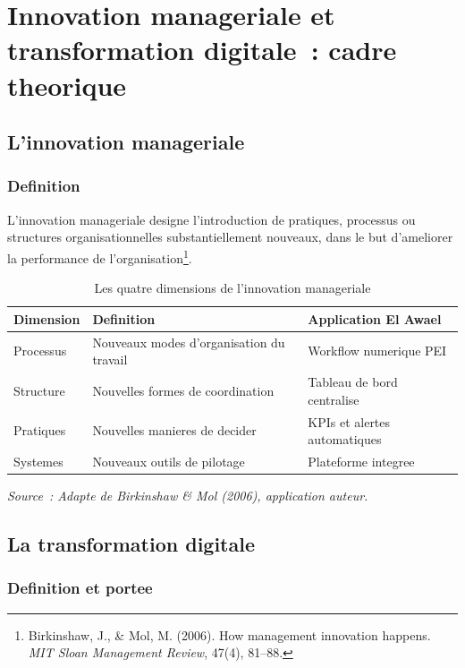 \documentclass[12pt,a4paper,openany]{report}
\begin{document}
\chapter{Innovation manageriale et transformation digitale~: cadre theorique}

\section{L'innovation manageriale}

\subsection{Definition}

L'innovation manageriale designe l'introduction de pratiques, processus
ou structures organisationnelles substantiellement nouveaux, dans le
but d'ameliorer la performance de l'organisation\footnote{Birkinshaw,
J., \& Mol, M. (2006). How management innovation happens. \textit{MIT
Sloan Management Review}, 47(4), 81--88.}.

\begin{table}[H]
\centering
\caption{Les quatre dimensions de l'innovation manageriale}
\label{tab:dimensions}
\begin{tabularx}{\textwidth}{lXX}
\toprule
\textbf{Dimension} & \textbf{Definition} & \textbf{Application El Awael}\\
\midrule
Processus & Nouveaux modes d'organisation du travail & Workflow numerique PEI\\
Structure & Nouvelles formes de coordination & Tableau de bord centralise\\
Pratiques & Nouvelles manieres de decider & KPIs et alertes automatiques\\
Systemes & Nouveaux outils de pilotage & Plateforme integree\\
\bottomrule
\end{tabularx}
\vspace{0.1cm}
\small\textit{Source~: Adapte de Birkinshaw \& Mol (2006), application auteur.}
\end{table}

\section{La transformation digitale}

\subsection{Definition et portee}
\end{document}
